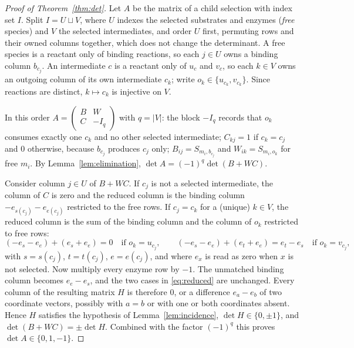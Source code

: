 \documentclass[11pt,a4paper]{article}
\theoremstyle{plain}
\theoremstyle{definition}
\theoremstyle{remark}
\newcommand{\C}{\mathbb C}
\begin{document}
\begin{proof}[Proof of Theorem~\ref{thm:det}]
Let $A$ be the matrix of a child selection with index set $I$. Split $I=U\sqcup V$, where $U$ indexes the selected substrates and enzymes (\emph{free} species) and $V$ the selected intermediates, and order $U$ first, permuting rows and their owned columns together, which does not change the determinant. A free species is a reactant only of binding reactions, so each $j\in U$ owns a binding column $b_{c_j}$. An intermediate $c$ is a reactant only of $u_c$ and $v_c$, so each $k\in V$ owns an outgoing column of its own intermediate $c_k$; write $o_k\in\{u_{c_k},v_{c_k}\}$. Since reactions are distinct, $k\mapsto c_k$ is injective on $V$.

In this order $A=\begin{pmatrix}B&W\\C&-I_q\end{pmatrix}$ with $q=|V|$: the block $-I_q$ records that $o_k$ consumes exactly one $c_k$ and no other selected intermediate; $C_{kj}=1$ if $c_k=c_j$ and $0$ otherwise, because $b_{c_j}$ produces $c_j$ only; $B_{ij}=S_{m_i,b_{c_j}}$ and $W_{ik}=S_{m_i,o_k}$ for free $m_i$. By Lemma~\ref{lem:elimination}, $\det A=(-1)^q\det(B+WC)$.

Consider column $j\in U$ of $B+WC$. If $c_j$ is not a selected intermediate, the column of $C$ is zero and the reduced column is the binding column $-e_{s(c_j)}-e_{e(c_j)}$ restricted to the free rows. If $c_j=c_k$ for a (unique) $k\in V$, the reduced column is the sum of the binding column and the column of $o_k$ restricted to free rows:
\begin{equation}\label{eq:reduced}
(-e_{s}-e_{e})+(e_{s}+e_{e})=0\quad\text{if }o_k=u_{c_j},\qquad
(-e_{s}-e_{e})+(e_{t}+e_{e})=e_{t}-e_{s}\quad\text{if }o_k=v_{c_j},
\end{equation}
with $s=s(c_j)$, $t=t(c_j)$, $e=e(c_j)$, and where $e_x$ is read as zero when $x$ is not selected. Now multiply every enzyme row by $-1$. The unmatched binding column becomes $e_{e}-e_{s}$, and the two cases in \eqref{eq:reduced} are unchanged. Every column of the resulting matrix $H$ is therefore $0$, or a difference $e_a-e_b$ of two coordinate vectors, possibly with $a=b$ or with one or both coordinates absent. Hence $H$ satisfies the hypothesis of Lemma~\ref{lem:incidence}, $\det H\in\{0,\pm1\}$, and $\det(B+WC)=\pm\det H$. Combined with the factor $(-1)^q$ this proves $\det A\in\{0,1,-1\}$.
\end{proof}
\end{document}

